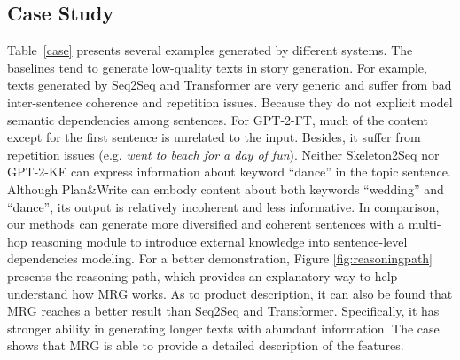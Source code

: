 \documentclass[letterpaper]{article} %
\begin{document}
\subsection{Case Study}
Table~\ref{case} presents several examples  generated  by different systems. 
The baselines tend to generate low-quality texts in story generation. For example, texts generated by Seq2Seq and Transformer are very generic and suffer from bad inter-sentence coherence and repetition issues. Because they do not explicit model semantic dependencies among sentences. For GPT-2-FT, much of the content except for the first sentence is unrelated to the input. Besides, it suffer from repetition issues (e.g. \textit{went to beach for a day of fun}). Neither Skeleton2Seq nor GPT-2-KE can express information about keyword ``dance'' in the topic sentence. Although Plan\&Write can embody content about both keywords ``wedding'' and ``dance'', its output is relatively incoherent and less informative.
In comparison, our methods can generate more diversified and coherent sentences with a multi-hop reasoning module to introduce external knowledge into sentence-level dependencies modeling.
For a better demonstration, Figure \ref{fig:reasoningpath} presents the reasoning path, which provides an explanatory way to help understand how MRG works. 
As to product description, it can also be found that MRG reaches a better result than Seq2Seq and Transformer. Specifically, it has stronger ability in generating longer texts with abundant information. The case shows that MRG is able to provide a detailed description of the features.%
\end{document}
